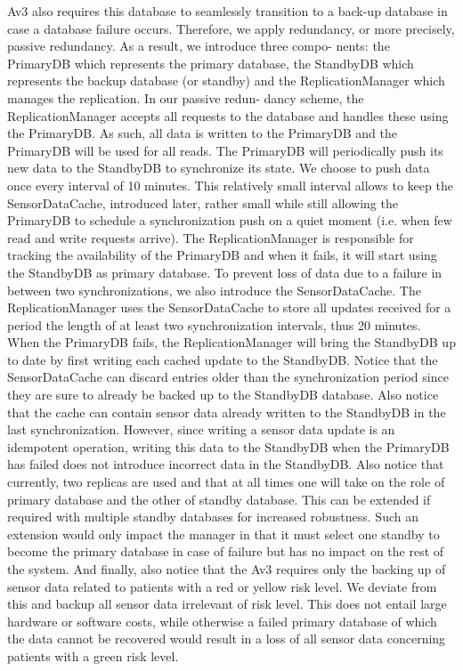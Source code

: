 \documentclass[a4paper,10pt]{article}
\begin{document}
 Av3 also requires this database to seamlessly transition to a back-up database in case a database failure occurs. Therefore, we apply redundancy, or more precisely, passive redundancy. As a result, we introduce three compo- nents: the PrimaryDB which represents the primary database, the StandbyDB which represents the backup database (or standby) and the ReplicationManager which manages the replication. In our passive redun- dancy scheme, the ReplicationManager accepts all requests to the database and handles these using the PrimaryDB. As such, all data is written to the PrimaryDB and the PrimaryDB will be used for all reads. The PrimaryDB will periodically push its new data to the StandbyDB to synchronize its state. We choose to push data once every interval of 10 minutes. This relatively small interval allows to keep the SensorDataCache, introduced later, rather small while still allowing the PrimaryDB to schedule a synchronization push on a quiet moment (i.e. when few read and write requests arrive). The ReplicationManager is responsible for tracking the availability of the PrimaryDB and when it fails, it will start using the StandbyDB as primary database. To prevent loss of data due to a failure in between two synchronizations, we also introduce the SensorDataCache. The ReplicationManager uses the SensorDataCache to store all updates received for a period the length of at least two synchronization intervals, thus 20 minutes. When the PrimaryDB fails, the ReplicationManager will bring the StandbyDB up to date by first writing each cached update to the StandbyDB. Notice that the SensorDataCache can discard entries older than the synchronization period since they are sure to already be backed up to the StandbyDB database. Also notice that the cache can contain sensor data already written to the StandbyDB in the last synchronization. However, since writing a sensor data update is an idempotent operation, writing this data to the StandbyDB when the PrimaryDB has failed does not introduce incorrect data in the StandbyDB. Also notice that currently, two replicas are used and that at all times one will take on the role of primary database and the other of standby database. This can be extended if required with multiple standby databases for increased robustness. Such an extension would only impact the manager in that it must select one standby to become the primary database in case of failure but has no impact on the rest of the system. And finally, also notice that the Av3 requires only the backing up of sensor data related to patients with a red or yellow risk level. We deviate from this and backup all sensor data irrelevant of risk level. This does not entail large hardware or software costs, while otherwise a failed primary database of which the data cannot be recovered would result in a loss of all sensor data concerning patients with a green risk level.
\end{document}
